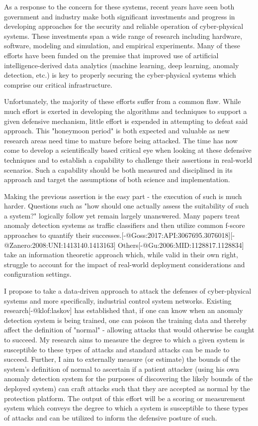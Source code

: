 As a response to the concern for these systems, recent years have seen both government and industry make both significant investments and progress in developing approaches for the security and reliable operation of cyber-physical systems. These investments span a wide range of research including hardware, software, modeling and simulation, and empirical experiments. Many of these efforts have been funded on the premise that improved use of artificial intelligence-derived data analytics (machine learning, deep learning, anomaly detection, etc.) is key to properly securing the cyber-physical systems which comprise our critical infrastructure.

Unfortunately, the majority of these efforts suffer from a common flaw. While much effort is exerted in developing the algorithms and techniques to support a given defensive mechanism, little effort is expended in attempting to defeat said approach. This "honeymoon period" is both expected and valuable as new research areas need time to mature before being attacked. The time has now come to develop a scientifically based critical eye when looking at these defensive techniques and to establish a capability to challenge their assertions in real-world scenarios. Such a capability should be both measured and disciplined in its approach and target the assumptions of both science and implementation.

Making the previous assertion is the easy part - the execution of such is much harder. Questions such as "how should one actually assess the suitability of such a system?" logically follow yet remain largely unanswered. Many papers treat anomaly detection systems as traffic classifiers and then utilize common f-score approaches to quantify their successes.[-@Goss:2017:API:3067695.3076018][-@Zanero:2008:UNI:1413140.1413163] Others[-@Gu:2006:MID:1128817.1128834] take an information theoretic approach which, while valid in their own right, struggle to account for the impact of real-world deployment considerations and configuration settings.

I propose to take a data-driven approach to attack the defenses of cyber-physical systems and more specifically, industrial control system networks. Existing research[-@klof:laskov] has established that, if one can know when an anomaly detection system is being trained, one can poison the training data and thereby affect the definition of "normal" - allowing attacks that would otherwise be caught to succeed. My research aims to measure the degree to which a given system is susceptible to these types of attacks and standard attacks can be made to succeed. Further, I aim to externally measure (or estimate) the bounds of the system's definition of normal to ascertain if a patient attacker (using his own anomaly detection system for the purposes of discovering the likely bounds of the deployed system) can craft attacks such that they are accepted as normal by the protection platform. The output of this effort will be a scoring or measurement system which conveys the degree to which a system is susceptible to these types of attacks and can be utilized to inform the defensive posture of such.

